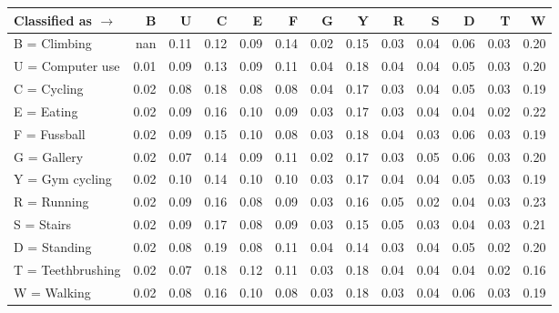 \begin{tabular}{lrrrrrrrrrrrr}
\toprule
Classified as $\rightarrow$ &    B &    U &    C &    E &    F &    G &    Y &    R &    S &    D &    T &    W \\
\midrule
B = Climbing      &  nan & 0.11 & 0.12 & 0.09 & 0.14 & 0.02 & 0.15 & 0.03 & 0.04 & 0.06 & 0.03 & 0.20 \\
U = Computer use  & 0.01 & 0.09 & 0.13 & 0.09 & 0.11 & 0.04 & 0.18 & 0.04 & 0.04 & 0.05 & 0.03 & 0.20 \\
C = Cycling       & 0.02 & 0.08 & 0.18 & 0.08 & 0.08 & 0.04 & 0.17 & 0.03 & 0.04 & 0.05 & 0.03 & 0.19 \\
E = Eating        & 0.02 & 0.09 & 0.16 & 0.10 & 0.09 & 0.03 & 0.17 & 0.03 & 0.04 & 0.04 & 0.02 & 0.22 \\
F = Fussball      & 0.02 & 0.09 & 0.15 & 0.10 & 0.08 & 0.03 & 0.18 & 0.04 & 0.03 & 0.06 & 0.03 & 0.19 \\
G = Gallery       & 0.02 & 0.07 & 0.14 & 0.09 & 0.11 & 0.02 & 0.17 & 0.03 & 0.05 & 0.06 & 0.03 & 0.20 \\
Y = Gym cycling   & 0.02 & 0.10 & 0.14 & 0.10 & 0.10 & 0.03 & 0.17 & 0.04 & 0.04 & 0.05 & 0.03 & 0.19 \\
R = Running       & 0.02 & 0.09 & 0.16 & 0.08 & 0.09 & 0.03 & 0.16 & 0.05 & 0.02 & 0.04 & 0.03 & 0.23 \\
S = Stairs        & 0.02 & 0.09 & 0.17 & 0.08 & 0.09 & 0.03 & 0.15 & 0.05 & 0.03 & 0.04 & 0.03 & 0.21 \\
D = Standing      & 0.02 & 0.08 & 0.19 & 0.08 & 0.11 & 0.04 & 0.14 & 0.03 & 0.04 & 0.05 & 0.02 & 0.20 \\
T = Teethbrushing & 0.02 & 0.07 & 0.18 & 0.12 & 0.11 & 0.03 & 0.18 & 0.04 & 0.04 & 0.04 & 0.02 & 0.16 \\
W = Walking       & 0.02 & 0.08 & 0.16 & 0.10 & 0.08 & 0.03 & 0.18 & 0.03 & 0.04 & 0.06 & 0.03 & 0.19 \\
\bottomrule
\end{tabular}
